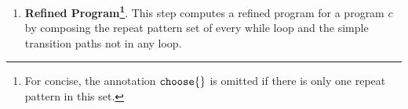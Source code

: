 \begin{enumerate}
%
\item \textbf{Refined Program\footnote{For concise, the annotation $\rpchoose{}$ is omitted if there is only one repeat pattern in this set.}}.
This step computes a refined program for a program $c$ by composing the
repeat pattern set of every while loop and the simple transition paths not in any loop.
\\

\end{enumerate}
